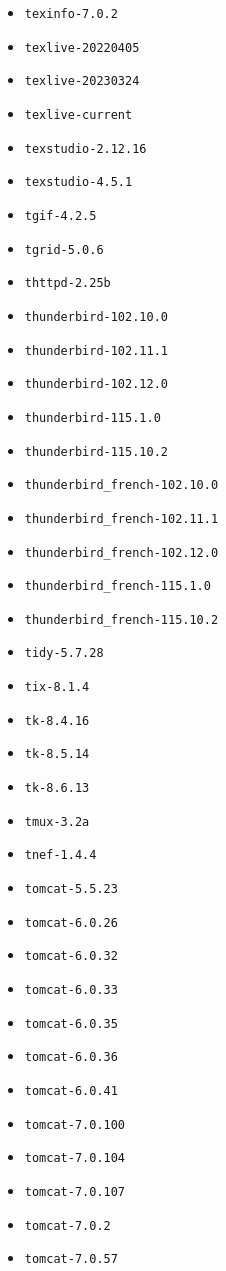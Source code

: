 \begin{multicols}{3}
\begin{itemize}
\item \verb|texinfo-7.0.2|
\item \verb|texlive-20220405|
\item \verb|texlive-20230324|
\item \verb|texlive-current|
\item \verb|texstudio-2.12.16|
\item \verb|texstudio-4.5.1|
\item \verb|tgif-4.2.5|
\item \verb|tgrid-5.0.6|
\item \verb|thttpd-2.25b|
\item \verb|thunderbird-102.10.0|
\item \verb|thunderbird-102.11.1|
\item \verb|thunderbird-102.12.0|
\item \verb|thunderbird-115.1.0|
\item \verb|thunderbird-115.10.2|
\item \verb|thunderbird_french-102.10.0|
\item \verb|thunderbird_french-102.11.1|
\item \verb|thunderbird_french-102.12.0|
\item \verb|thunderbird_french-115.1.0|
\item \verb|thunderbird_french-115.10.2|
\item \verb|tidy-5.7.28|
\item \verb|tix-8.1.4|
\item \verb|tk-8.4.16|
\item \verb|tk-8.5.14|
\item \verb|tk-8.6.13|
\item \verb|tmux-3.2a|
\item \verb|tnef-1.4.4|
\item \verb|tomcat-5.5.23|
\item \verb|tomcat-6.0.26|
\item \verb|tomcat-6.0.32|
\item \verb|tomcat-6.0.33|
\item \verb|tomcat-6.0.35|
\item \verb|tomcat-6.0.36|
\item \verb|tomcat-6.0.41|
\item \verb|tomcat-7.0.100|
\item \verb|tomcat-7.0.104|
\item \verb|tomcat-7.0.107|
\item \verb|tomcat-7.0.2|
\item \verb|tomcat-7.0.57|

\end{itemize}
\end{multicols}
